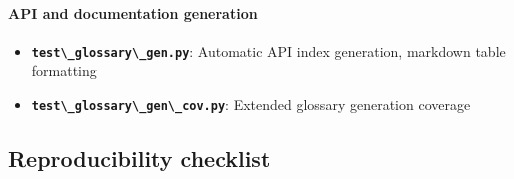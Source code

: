 \documentclass[
  10pt,
]{article}
\newcommand{\passthrough}[1]{#1}
\providecommand{\tightlist}{%
  \setlength{\itemsep}{0pt}\setlength{\parskip}{0pt}}
\begin{document}
\paragraph{API and documentation
generation}\label{api-and-documentation-generation}

\begin{itemize}
\tightlist
\item
  \textbf{\passthrough{\lstinline!test\_glossary\_gen.py!}}: Automatic
  API index generation, markdown table formatting
\item
  \textbf{\passthrough{\lstinline!test\_glossary\_gen\_cov.py!}}:
  Extended glossary generation coverage
\end{itemize}

\subsection{Reproducibility checklist}\label{reproducibility-checklist}
\end{document}
